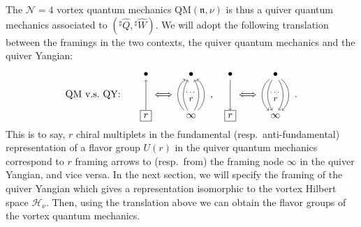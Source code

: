 \documentclass[12pt,a4paper]{article}
\newcommand{\nn}{\mathfrak{n}}
\renewcommand{\(}{\left(}
\renewcommand{\)}{\right)}
\renewcommand{\(}{\left(}
\renewcommand{\)}{\right)}
\begin{document}
The $\mathcal{N}=4$ vortex quantum mechanics QM$(\nn,\nu)$ is thus a quiver quantum mechanics associated to $({}^\sharp\widehat{Q},{}^\sharp \widehat{W})$.
We will adopt the following translation between the framings in the two contexts, the quiver quantum mechanics and the quiver Yangian:
\begin{equation}\label{eq:translation_QM_QY}
	\text{QM v.s.\ QY:}\qquad
	\begin{tikzpicture}[baseline={([yshift=-.5ex]current bounding box.center)},vertex/.style={anchor=base,
			circle,fill=black!25,minimum size=18pt,inner sep=2pt}]
		\node (va) at (0,1) {$\bullet$};
		\node (r) at (0,-0.5) [rectangle,draw] {$r$};
		\draw[->] (r) edge (va);
	\end{tikzpicture}
	\Longleftrightarrow
	\begin{tikzpicture}[baseline={([yshift=-.5ex]current bounding box.center)},vertex/.style={anchor=base,circle,fill=black!25,minimum size=18pt,inner sep=2pt}]
		\node (va) at (0,1) {$\bullet$};
		\node (r) at (0,-0.5)  {$\infty$};
		\draw[->] (r) edge[bend left =50] (va);
		\draw[->] (r) edge[bend left =30] (va);
		\draw[->] (r) edge[bend right =30] (va);
		\draw[->] (r) edge[bend right =50] (va);
		\node at (0,0.35) {{\scriptsize $\dots$}};
		\node at (0,0.1) {{\small $r$}};
	\end{tikzpicture}\,\, ,
	\quad
	\begin{tikzpicture}[baseline={([yshift=-.5ex]current bounding box.center)},vertex/.style={anchor=base,circle,fill=black!25,minimum size=18pt,inner sep=2pt}]
		\node (va) at (0,1) {$\bullet$};
		\node (r) at (0,-0.5) [rectangle,draw] {$r$};
		\draw[->] (va) edge (r);
	\end{tikzpicture}
	\Longleftrightarrow
	\begin{tikzpicture}[baseline={([yshift=-.5ex]current bounding box.center)},vertex/.style={anchor=base,circle,fill=black!25,minimum size=18pt,inner sep=2pt}]
		\node (va) at (0,1) {$\bullet$};
		\node (r) at (0,-0.5)  {$\infty$};
		\draw[->] (va) edge[bend left =50] (r);
		\draw[->] (va) edge[bend left =30] (r);
		\draw[->] (va) edge[bend right =30] (r);
		\draw[->] (va) edge[bend right =50] (r);
		\node at (0,0.35) {{\scriptsize $\dots$}};
		\node at (0,0.1) {{\small $r$}};
	\end{tikzpicture}\,\,.
\end{equation}
This is to say, $r$ chiral multiplets in the fundamental (resp.\ anti-fundamental) representation of a flavor group $U(r)$ in the quiver quantum mechanics correspond to $r$ framing arrows to (resp.\ from) the framing node $\infty$ in the quiver Yangian, and vice versa. 
In the next section, we will specify the framing of the quiver Yangian which gives a representation isomorphic to the vortex Hilbert space $\mathcal{H}_\nu$. 
Then, using the translation above we can obtain the flavor groups of the vortex quantum mechanics.
\end{document}
